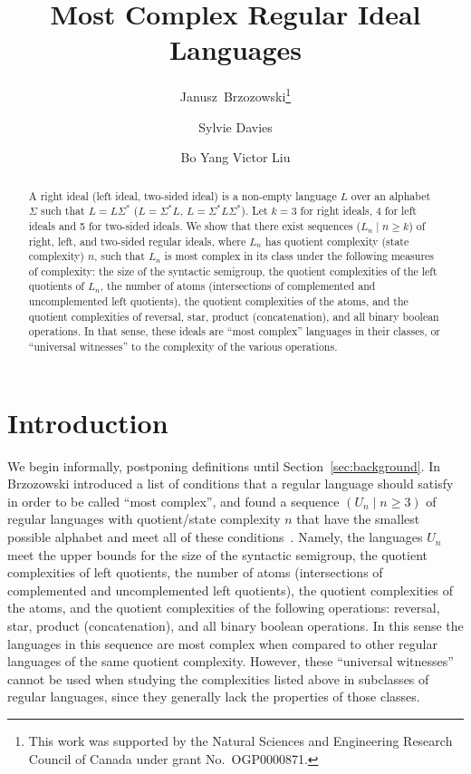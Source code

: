 \documentclass[final]{dmtcs-episciences}
\title{Most Complex Regular Ideal Languages}
\author{Janusz~Brzozowski\affiliationmark{1}\thanks{This work was supported by the Natural Sciences and Engineering Research Council of Canada under grant No.~OGP0000871.}
\and Sylvie Davies\affiliationmark{2} \and Bo Yang Victor Liu\affiliationmark{1}}
\affiliation{David R. Cheriton School of Computer Science, University of Waterloo \\
Department of Pure Mathematics, University of Waterloo}
\renewcommand{\ge}{\geqslant}
\theoremstyle{definition}
\theoremstyle{remark}
\begin{document}

\maketitle
\begin{abstract}
A right ideal (left ideal, two-sided ideal) is a non-empty language $L$ over an alphabet $\Sigma$ 
such that
$L=L\Sigma^*$ ($L=\Sigma^*L$, $L=\Sigma^*L\Sigma^*$).
Let $k=3$ for right ideals, 4 for left ideals and 5 for two-sided ideals.
We show that there exist sequences ($L_n \mid n \ge k $) of  right, left, and two-sided regular ideals, where $L_n$ has quotient complexity (state complexity) $n$, such that 
$L_n$ is most complex in its class under the following measures of complexity: 
the size of the syntactic semigroup,
the quotient complexities of the left quotients of $L_n$,  
the number of atoms (intersections of complemented and uncomplemented left quotients), 
the quotient complexities of the atoms,  
and the quotient complexities  of 
reversal, 
star,  
product (concatenation), 
and all binary boolean operations.
In that sense, these ideals are ``most complex'' languages in their classes, or ``universal witnesses'' to the complexity of the various operations.
\end{abstract}



\section{Introduction}
\label{sec:introduction}

We begin informally, postponing definitions until Section~\ref{sec:background}.
In~\cite{Brz13} Brzozowski introduced a list of conditions that a regular language should satisfy in order to be called ``most  complex'', and found a sequence $(U_n \mid n \ge 3)$ of  regular languages with quotient/state complexity $n$ that have the smallest possible alphabet and meet all of these conditions~\cite{Brz13}.
Namely, the languages $U_n$ meet the upper bounds for 
the size of the syntactic semigroup,
the quotient complexities of left quotients,
the number of atoms (intersections of complemented and uncomplemented left quotients),
the quotient complexities of the atoms, 
and the quotient complexities of  the following operations:
reversal, 
star, 
product (concatenation), 
and all binary boolean operations.
In this sense the languages in this sequence are most complex when compared to other regular languages of the same quotient complexity.
However, these  ``universal witnesses''
cannot be used when studying the complexities listed above in subclasses of regular languages, since they generally lack the properties of those classes.
\end{document}
